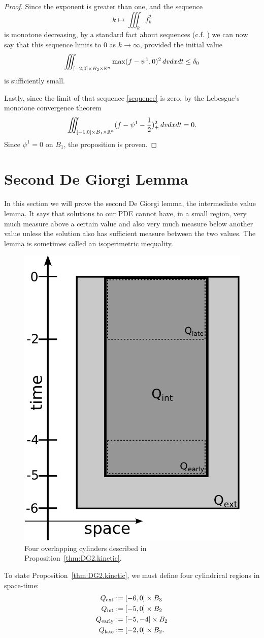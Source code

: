 \begin{proof}
Since the exponent is greater than one, and the sequence
\begin{equation}\label{sequence} 
k \mapsto \iiint_k f_k^2 
\end{equation}
is monotone decreasing, by a standard fact about sequences (c.f. \cite{Va.dg}) we can now say that this sequence limits to 0 as $k \to \infty$, provided the initial value
\[ \iiint_{[-2,0]\times B_2 \times \mathbb{R}^n} \max(f-\psi^1,0)^2 \,dvdxdt \leq \delta_0 \]
is sufficiently small.  

Lastly, since the limit of that sequence \eqref{sequence} is zero, by the Lebesgue's monotone convergence theorem
\[ \iiint_{[-1,0] \times B_1 \times \mathbb{R}^n} (f - \psi^1 - \frac{1}{2})_+^2 \,dvdxdt = 0. \]
Since $\psi^1 = 0$ on $B_1$, the proposition is proven.  

\end{proof}


\section{Second De Giorgi Lemma}\label{sec:DG2.kinetic}

In this section we will prove the second De Giorgi lemma, the intermediate value lemma.  It says that solutions to our PDE cannot have, in a small region, very much measure above a certain value and also very much measure below another value unless the solution also has sufficient measure between the two values.  The lemma is sometimes called an isoperimetric inequality. 

\begin{figure}[h]
\centering
\includegraphics[width=.25 \textwidth]{NFP-diagram-Q-3}
\caption{Four overlapping cylinders described in Proposition~\ref{thm:DG2.kinetic}.}
\end{figure}

To state Proposition~\ref{thm:DG2.kinetic}, we must define four cylindrical regions in space-time:
\begin{align*} 
{Q_\textrm{ext}} &:= [-6,0]\times B_3 \\
{Q_\textrm{int}} &:= [-5,0]\times B_2 \\
{Q_\textrm{early}} &:= [-5,-4]\times B_2 \\
{Q_\textrm{late}} &:= [-2,0]\times B_2. \\
\end{align*}

